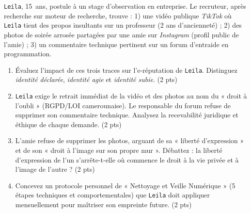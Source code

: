 \documentclass[11pt]{article}
\begin{document}
\begin{exercice}
\texttt{Leila}, \SI{15}{ans}, postule à un stage d'observation en entreprise. Le recruteur, après recherche sur moteur de recherche, trouve : 1) une vidéo publique \textit{TikTok} où \texttt{Leila} tient des propos insultants sur un professeur (2 ans d'ancienneté) ; 2) des photos de soirée arrosée partagées par une amie sur \textit{Instagram} (profil public de l'amie) ; 3) un commentaire technique pertinent sur un forum d'entraide en programmation.
\begin{enumerate}
    \item Évaluez l'impact de ces trois traces sur l'e-réputation de \texttt{Leila}. Distinguez \textit{identité déclarée}, \textit{identité agie} et \textit{identité subie}. (2 pts)
    \item \texttt{Leila} exige le retrait immédiat de la vidéo et des photos au nom du « droit à l'oubli » (RGPD/LOI camerounaise). Le responsable du forum refuse de supprimer son commentaire technique. Analysez la recevabilité juridique et éthique de chaque demande. (2 pts)
    \item L'amie refuse de supprimer les photos, arguant de sa « liberté d'expression » et de son « droit à l'image sur son propre mur ». Débattez : la liberté d'expression de l'un s'arrête-t-elle où commence le droit à la vie privée et à l'image de l'autre ? (2 pts)
    \item Concevez un protocole personnel de « Nettoyage et Veille Numérique » (5 étapes techniques et comportementales) que \texttt{Leila} doit appliquer mensuellement pour maîtriser son empreinte future. (2 pts)
\end{enumerate}
\end{exercice}
\end{document}
